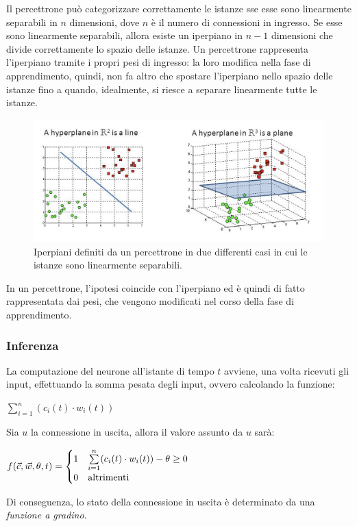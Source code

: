 Il percettrone può categorizzare correttamente le istanze sse esse sono linearmente separabili in $n$ dimensioni, dove $n$ è il numero di connessioni in ingresso. Se esse sono linearmente separabili, allora esiste un iperpiano in $n-1$ dimensioni che divide correttamente lo spazio delle istanze.
Un percettrone rappresenta l'iperpiano tramite i propri  pesi di ingresso: la loro modifica nella fase di apprendimento, quindi, non fa altro che spostare l'iperpiano nello spazio delle istanze fino a quando, idealmente, si riesce a separare linearmente tutte le istanze.
\begin{figure}[h]
    \centering
    \includegraphics[width=1\linewidth]{img/hyperplane_perceptron.png}
    \caption{Iperpiani definiti da un percettrone in due differenti casi in cui le istanze sono linearmente separabili.}
    \label{fig:hyperplane_perceptron}
\end{figure}
In un percettrone, l'ipotesi coincide con l'iperpiano ed è quindi di fatto rappresentata dai pesi, che vengono modificati nel corso della fase di apprendimento.

\subsubsection{Inferenza}
La computazione del neurone all'istante di tempo $t$ avviene, una volta ricevuti gli input, effettuando la somma pesata degli input, ovvero calcolando la funzione:
\begin{center}
    $\sum\limits_{i = 1}^{n} (c_i(t) \cdot w_i(t))$
\end{center}
Sia $u$ la connessione in uscita, allora il valore assunto da $u$ sarà:
\begin{center}
    $f(\Vec{c}, \Vec{w}, \theta, t) = \begin{cases}
        1 & \sum\limits_{i = 1}^{n} (c_i(t) \cdot w_i(t)) - \theta \ge 0 \\
        0 & \textnormal{altrimenti}
    \end{cases}$
\end{center}
Di conseguenza, lo stato della connessione in uscita è determinato da una \textit{funzione a gradino}.

